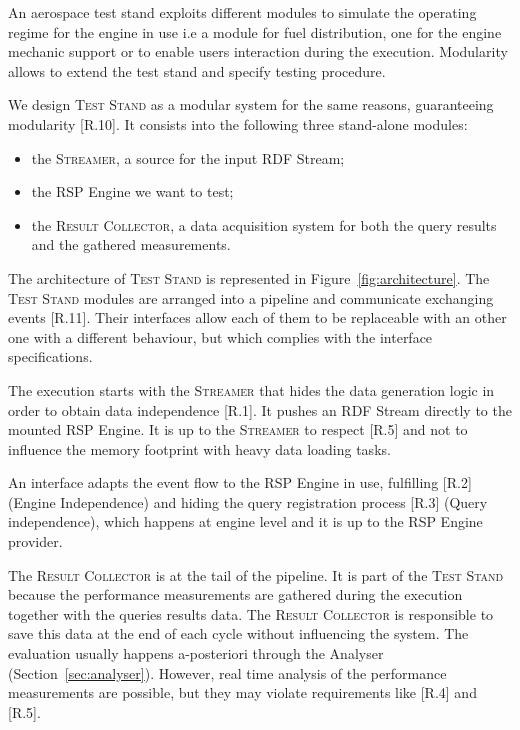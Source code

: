 \noindent An aerospace test stand exploits different modules to simulate the operating regime for the engine in use  i.e a module for fuel distribution, one for the engine mechanic support or to enable users interaction during the execution. Modularity allows to extend the test stand and specify testing procedure. 

We design \name \textsc{Test Stand} as a modular system for the same reasons, guaranteeing modularity [R.10]. It consists into the following three stand-alone modules:
\begin{itemize}
\item the \textsc{Streamer}, a source for the input RDF Stream;
\item the RSP Engine we want to test;
\item the \textsc{Result Collector}, a data acquisition system for both the query results and the gathered measurements.
\end{itemize}

\noindent The architecture of \name \textsc{Test Stand} is represented in Figure~\ref{fig:architecture}. The \textsc{Test Stand} modules are arranged into a pipeline and communicate exchanging events [R.11]. Their interfaces allow each of them to be replaceable with an other one with a different behaviour, but which complies with the interface specifications.

The execution starts with the \textsc{Streamer} that hides the data generation logic in order to obtain data independence [R.1]. It pushes an RDF Stream directly to the mounted RSP Engine. It is up to the \textsc{Streamer} to respect [R.5] and not to influence the memory footprint with heavy data loading tasks. 

An interface adapts the event flow to the RSP Engine in use, fulfilling [R.2] (Engine Independence) and hiding the query registration process [R.3] (Query independence), which happens at engine level and it is up to the RSP Engine provider.

The \textsc{Result Collector} is at the tail of the pipeline. It is part of the \textsc{Test Stand} because the performance measurements are gathered during the execution together with the queries results data. The \textsc{Result Collector} is responsible to save this data at the end of each cycle without influencing the system. The evaluation usually happens a-posteriori through the Analyser (Section~\ref{sec:analyser}). However, real time analysis of the performance measurements are possible, but they may violate requirements like [R.4] and [R.5]. 


